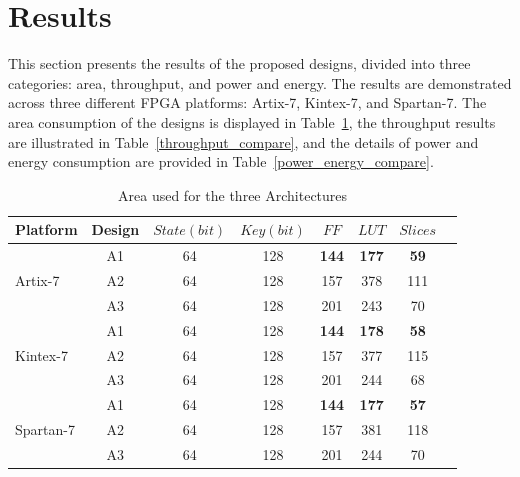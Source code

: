 \documentclass[final,5p,times,twocolumn]{elsarticle}
\begin{document}
\section{Results}\label{sec5}

This section presents the results of the proposed designs, divided into three categories: area, throughput, and power and energy. The results are demonstrated across three different FPGA platforms: Artix-7, Kintex-7, and Spartan-7. The area consumption of the designs is displayed in Table~\ref{area_compare}, the throughput results are illustrated in Table~\ref{throughput_compare}, and the details of power and energy consumption are provided in Table~\ref{power_energy_compare}.


\begin{table}[h]
    \caption{Area used for the three Architectures}\label{area_compare}%
    \begin{tabular*}{\textwidth}{@{\extracolsep\fill}lccccccc}
        \toprule
        Platform & Design & $State(bit)$ & $Key(bit)$ & $FF$ & $LUT$ & $Slices$ \\
        \midrule
        \multirow{3}{*}{Artix-7}  & A1 & 64 & 128 & \textbf{144} & \textbf{177} & \textbf{59} \\
        & A2 & 64 & 128 & 157 & 378 & 111 \\
        & A3 & 64 & 128 & 201 & 243 & 70 \\
        \midrule
        \multirow{3}{*}{Kintex-7} & A1 & 64 & 128 & \textbf{144} & \textbf{178} & \textbf{58}\\
        & A2 & 64 & 128 & 157 & 377 & 115 \\
        & A3 & 64 & 128 & 201 & 244 & 68 \\
        \midrule
        \multirow{3}{*}{Spartan-7} & A1 & 64 & 128 & \textbf{144} & \textbf{177} & \textbf{57}\\
        & A2 & 64 & 128 & 157 & 381 & 118 \\
        & A3 & 64 & 128 & 201 & 244 & 70 \\
        \bottomrule
    \end{tabular*}
\end{table}
\end{document}
